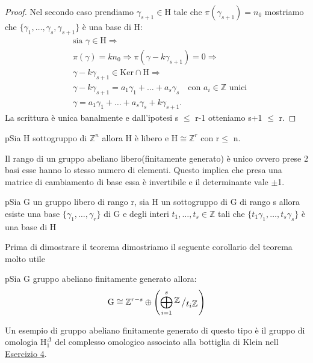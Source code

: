 \documentclass[11pt, a4paper, twoside]{article}
\newcommand{\bigslant}[2]{{\raisebox{.2em}{$#1$}\left/\raisebox{-.2em}{$#2$}\right.}}
\begin{document}
\begin{proof}
	Nel secondo caso prendiamo $\gamma_{s+1}\in\text{H}$ tale che $\pi(\gamma_{s+1})=n_0$ mostriamo che $\{\gamma_1,\dots,\gamma_s,\gamma_{s+1}\}$ è una base di H: 
	\begin{align*}
		&\text{sia }\gamma\in\text{H}\Rightarrow \\ 
		&\pi(\gamma)=kn_0 \Rightarrow \pi(\gamma-k\gamma_{s+1})=0 \Rightarrow \\ 
		& \gamma-k\gamma_{s+1}\in\text{Ker}\cap\text{H}\Rightarrow\\ 
		&\gamma-k\gamma_{s+1}=a_1\gamma_1+\dots+a_s\gamma_s\quad \text{con }a_i\in\mathbb{Z}\text{ unici}\\ 
		&\gamma=a_1\gamma_1+\dots+a_s\gamma_s+k\gamma_{s+1}.
	\end{align*}
	La scrittura è unica banalmente e dall'ipotesi s $\leq$ r-1 otteniamo s+1 $\leq$ r.
\end{proof}

\begin{cor}{}
	pSia H sottogruppo di $\mathbb{Z}^n$ allora H è libero e H$\cong\mathbb{Z}^r$ con r$\leq$ n.
\end{cor}
\begin{oss}
	Il rango di un gruppo abeliano libero(finitamente generato) è unico ovvero prese 2 basi esse hanno lo stesso numero di elementi. Questo implica che presa una matrice di cambiamento di base essa è invertibile e il determinante vale $\pm$1.
\end{oss}

\begin{thm}{}
	pSia G un gruppo libero di rango r, sia H un sottogruppo di G di rango s allora esiste una base $\{\gamma_1,\dots,\gamma_r\}$ di G e degli interi $t_1,\dots,t_s\in\mathbb{Z}$ tali che $\{t_1\gamma_1,\dots,t_s\gamma_s\}$ è una base di H 
\end{thm}

Prima di dimostrare il teorema dimostriamo il seguente corollario del teorema molto utile 
\begin{cor}{}
	pSia G gruppo abeliano finitamente generato allora:
	\[
		\text{G}\cong\mathbb{Z}^{r-s} \oplus \left(\bigoplus\limits_{i=1}^s\bigslant{\mathbb{Z}}{t_i\mathbb{Z}}\right)
	\]
\end{cor}

\begin{es}
	Un esempio di gruppo abeliano finitamente generato di questo tipo è il gruppo di omologia $\text{H}_1^{\Delta}$ del complesso omologico associato alla bottiglia di Klein nell \hyperref[Bottiglia di Klein]{Esercizio 4}.
\end{es}
\end{document}
